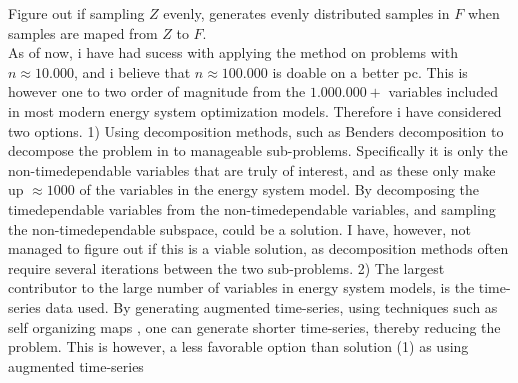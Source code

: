 \documentclass[11pt,a4paper,english]{article}
\begin{document}
Figure out if sampling $Z$ evenly, generates evenly distributed samples in $F$ when samples are maped from $Z$ to $F$. \\

As of now, i have had sucess with applying the method on problems with $n\approx 10.000$, and i believe that $n\approx 100.000$ is doable on a better pc. This is however one to two order of magnitude from the $1.000.000+$ variables included in most modern energy system optimization models. Therefore i have considered two options. 1) Using decomposition methods, such as Benders decomposition to decompose the problem in to manageable sub-problems. Specifically it is only the non-timedependable variables that are truly of interest, and as these only make up $\approx 1000$ of the variables in the energy system model. By decomposing the timedependable variables from the non-timedependable variables, and sampling the non-timedependable subspace, could be a solution. I have, however, not managed to figure out if this is a viable solution, as decomposition methods often require several iterations between the two sub-problems.  
2) The largest contributor to the large number of variables in energy system models, is the time-series data used. By generating augmented time-series, using techniques such as self organizing maps \cite{Hasan2019}, one can generate shorter time-series, thereby reducing the problem. This is however, a less favorable option than solution (1) as using augmented time-series 

\clearpage
\printbibliography
\end{document}
